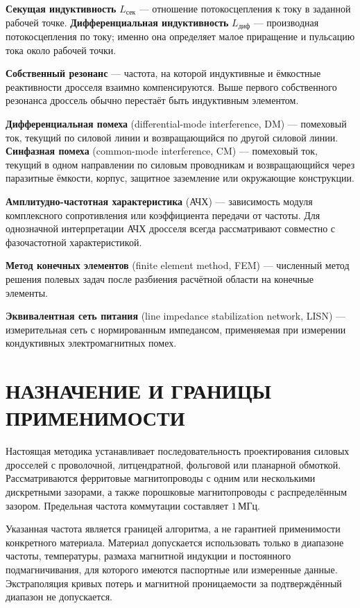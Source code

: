 \documentclass[14pt,a4paper]{extarticle}
\begin{document}
\textbf{Секущая индуктивность} $L_{\text{сек}}$ --- отношение потокосцепления
к току в заданной рабочей точке. \textbf{Дифференциальная индуктивность}
$L_{\text{диф}}$ --- производная потокосцепления по току; именно она определяет
малое приращение и пульсацию тока около рабочей точки.

\textbf{Собственный резонанс} --- частота, на которой индуктивные и ёмкостные
реактивности дросселя взаимно компенсируются. Выше первого собственного
резонанса дроссель обычно перестаёт быть индуктивным элементом.

\textbf{Дифференциальная помеха} (differential-mode interference, DM) ---
помеховый ток, текущий по силовой линии и возвращающийся по другой силовой
линии. \textbf{Синфазная помеха} (common-mode interference, CM) --- помеховый
ток, текущий в одном направлении по силовым проводникам и возвращающийся через
паразитные ёмкости, корпус, защитное заземление или окружающие конструкции.

\textbf{Амплитудно-частотная характеристика} (АЧХ) --- зависимость модуля
комплексного сопротивления или коэффициента передачи от частоты. Для
однозначной интерпретации АЧХ дросселя всегда рассматривают совместно с
фазочастотной характеристикой.

\textbf{Метод конечных элементов} (finite element method, FEM) --- численный
метод решения полевых задач после разбиения расчётной области на конечные
элементы.

\textbf{Эквивалентная сеть питания} (line impedance stabilization network,
LISN) --- измерительная сеть с нормированным импедансом, применяемая при
измерении кондуктивных электромагнитных помех.

\newpage

\section{НАЗНАЧЕНИЕ И ГРАНИЦЫ ПРИМЕНИМОСТИ}
\label{sec:scope}

Настоящая методика устанавливает последовательность проектирования силовых
дросселей с проволочной, литцендратной, фольговой или планарной обмоткой.
Рассматриваются ферритовые магнитопроводы с одним или несколькими дискретными
зазорами, а также порошковые магнитопроводы с распределённым зазором.
Предельная частота коммутации составляет $1\,\text{МГц}$.

Указанная частота является границей алгоритма, а не гарантией применимости
конкретного материала. Материал допускается использовать только в диапазоне
частоты, температуры, размаха магнитной индукции и постоянного
подмагничивания, для которого имеются паспортные или измеренные данные.
Экстраполяция кривых потерь и магнитной проницаемости за подтверждённый
диапазон не допускается.
\end{document}
